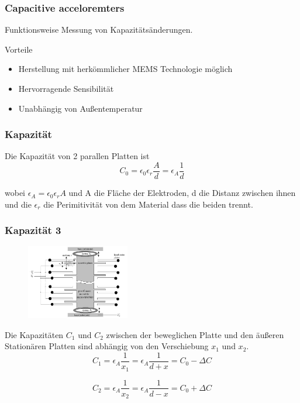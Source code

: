 \documentclass[10pt,a4paper,oneside]{beamer}
\begin{document}
\begin{frame}
	\frametitle{Capacitive acceloremters}
	\begin{block}{Funktionsweise}
		Messung von Kapazitätsänderungen.
	\end{block}

    \bigskip
    
	Vorteile
 	\begin{itemize}
 		\item Herstellung mit herkömmlicher MEMS Technologie möglich
 		\item Hervorragende Sensibilität
		\item Unabhängig von Außentemperatur
 	\end{itemize}
\end{frame}

\begin{frame}
	\frametitle{Kapazität}
	Die Kapazität von 2 parallen Platten ist \cite{AM08}
	\begin{equation}
		C_{0} = \epsilon_{0} \epsilon_{r} \frac{A}{d} = \epsilon_{A} \frac{1}{d}
	\end{equation}
	
	wobei $\epsilon_{A} = \epsilon_{0} \epsilon_{r} A$ und A die Fläche der Elektroden, d die Distanz zwischen ihnen und die $\epsilon_{r}$ die Perimitivität von dem Material dass die beiden trennt.

\end{frame}

\begin{frame}
	\frametitle{Kapazität 3}

\begin{figure}

\includegraphics[width=0.4\textwidth]{images/acceleromter_structure.png}

\end{figure}

Die Kapazitäten $C_{1}$ und $C_{2}$ zwischen der beweglichen Platte und den äußeren Stationären Platten sind abhängig von den Verschiebung $x_{1}$ und $x_{2}$.
	\begin{equation}
		C_{1} = \epsilon_{A} \frac{1}{x_{1}} 
			  = \epsilon_{A} \frac{1}{d+x} 
			  = C_{0} - \Delta C
	\end{equation}
	
	\begin{equation}
		C_{2} = \epsilon_{A} \frac{1}{x_{2}} 
		      = \epsilon_{A} \frac{1}{d-x} 
		      = C_{0} + \Delta C
	\end{equation}
	
\end{frame}
\end{document}
